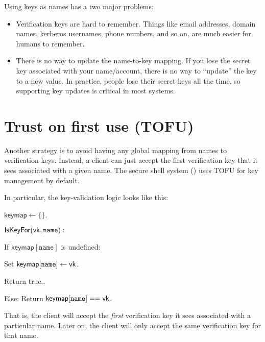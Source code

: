 Using keys as names has a two major problems:
\begin{itemize}
	\item Verification keys are hard to remember. Things like email addresses, domain names, kerberos usernames, phone numbers, and so on, are much easier for humans to remember.
	\item There is no way to update the name-to-key mapping. If you lose the secret key associated with your name/account, there is no way to ``update'' the key to a new value. In practice, people lose their secret keys all the time, so supporting key updates is critical in most systems.
\end{itemize}


\section{Trust on first use (TOFU)}
Another strategy is to avoid having any global mapping from names to verification keys.
Instead, a client can just accept the first verification key 
that it sees associated with a given name.
The secure shell system () uses TOFU for key management by default.

In particular, the key-validation logic looks like this:

\begin{framed}
\noindent
$\mathsf{keymap} \gets \{ \}$.

\medskip
\noindent
$\mathsf{IsKeyFor}(\mathsf{vk}, \texttt{name}):$ 
\begin{compactitem}
\item If $\mathsf{keymap}[\texttt{name}]$ is undefined:
      \begin{compactitem}
      \item Set $\mathsf{keymap}[\texttt{name}] \gets \mathsf{vk}$.
      \item Return true..
      \end{compactitem}

\item Else: Return $\mathsf{keymap}[\texttt{name}] == \mathsf{vk}$.
\end{compactitem}
\end{framed}

That is, the client will accept the \emph{first} verification key 
it sees associated with a particular name.
Later on, the client will only accept the same verification key
for that name.

